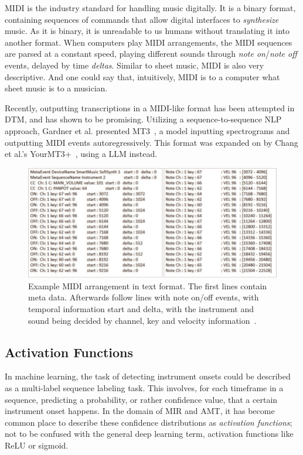 \gls{MIDI} is the industry standard for handling music digitally. It is a binary format, containing sequences of commands that allow digital interfaces to \textit{synthesize} music. As it is binary, it is unreadable to us humans without translating it into another format. When computers play \gls{MIDI} arrangements, the \gls{MIDI} sequences are parsed at a constant speed, playing different sounds through \textit{note on}/\textit{note off} events, delayed by time \textit{deltas}. Similar to sheet music, \gls{MIDI} is also very descriptive. And one could say that, intuitively, \gls{MIDI} is to a computer what sheet music is to a musician.

Recently, outputting transcriptions in a \gls{MIDI}-like format has been attempted in \gls{DTM}, and has shown to be promising. Utilizing a sequence-to-sequence \gls{NLP} approach, Gardner et al. presented MT3~\cite{gardner2022mt3multitaskmultitrackmusic}, a model inputting spectrograms and outputting \gls{MIDI} events autoregressively. This format was expanded on by Chang et al.'s YourMT3+~\cite{chang2024yourmt3+}, using a \gls{LLM} instead.

\begin{figure}[H]
    \centering
    \includegraphics[scale=0.65, trim={0 0 13.8cm 0},clip]{figures/midi}
    \caption{Example MIDI arrangement in text format. The first lines contain meta data. Afterwards follow lines with note on/off events, with temporal information start and delta, with the instrument and sound being decided by channel, key and velocity information~\cite{starostenko2019}.}
    \label{MIDIFigure}
\end{figure}

\subsection{Activation Functions}

In machine learning, the task of detecting instrument onsets could be described as a multi-label sequence labeling task. This involves, for each timeframe in a sequence, predicting a probability, or rather confidence value, that a certain instrument onset happens. In the domain of \gls{MIR} and \gls{AMT}, it has become common place to describe these confidence distributions as \textit{activation functions}; not to be confused with the general deep learning term, activation functions like ReLU or sigmoid.~\cite{8350302, Southall2016AutomaticDT, vogl2018multiinstrumentdrumtranscription}

